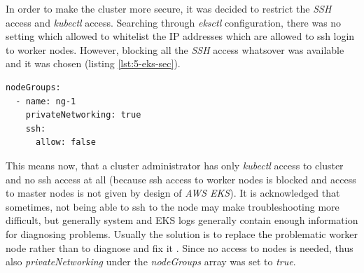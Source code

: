 In order to make the cluster more secure, it was decided to restrict the \textit{SSH} access and \textit{kubectl} access. Searching through \textit{eksctl} configuration, there was no setting which allowed to whitelist the IP addresses which are allowed to ssh login to worker nodes. However, blocking all the \textit{SSH} access whatsover was available and it was chosen (listing \ref{lst:5-eks-sec}).
\begin{lstlisting}[basicstyle=\scriptsize,xleftmargin=0cm,label=lst:5-eks-sec,caption={\textit{Eksctl} configuration applying security measures},captionpos=b,language=Bash ]
nodeGroups:
  - name: ng-1
    privateNetworking: true
    ssh:
      allow: false
\end{lstlisting}
This means now, that a cluster administrator has only \textit{kubectl} access to cluster and no ssh access at all (because ssh access to worker nodes is blocked and access to master nodes is not given by design of \textit{AWS EKS}). It is acknowledged that sometimes, not being able to ssh to the node may make troubleshooting more difficult, but generally system and EKS logs generally contain enough information for diagnosing problems. Usually the solution is to replace the problematic worker node rather than to diagnose and fix it \cite{eks-security}. Since no access to nodes is needed, thus also \textit{privateNetworking} under the \textit{nodeGroups} array was set to \textit{true}.

